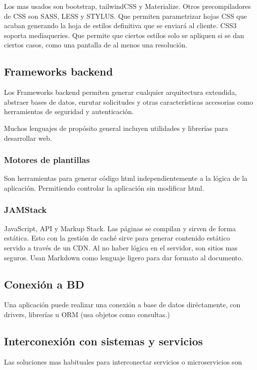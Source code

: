     Los mas usados son bootstrap, tailwindCSS y Materialize. Otros precompiladores de CSS son SASS, LESS y STYLUS. Que permiten parametrizar hojas CSS que acaban generando la hoja de estilos definitiva que se enviará al cliente. CSS3 soporta mediaqueries. Que permite que ciertos estilos solo se apliquen si se dan ciertos casos, como una pantalla de al menos una resolución.

\subsection{Frameworks backend}
    Los Frameworks backend permiten generar cualquier arquitectura extendida, abstraer bases de datos, enrutar solicitudes y otras características accesorias como herramientas de seguridad y autenticación.

    Muchos lenguajes de propósito general incluyen utilidades y librerías para desarrollar web.

    \subsubsection{Motores de plantillas}
        Son herramientas para generar código html independientemente a la lógica de la aplicación. Permitiendo controlar la aplicación sin modificar html.

    \subsubsection{JAMStack}
        JavaScript, API y Markup Stack. Las páginas se compilan y sirven de forma estática. Esto con la gestión de caché sirve para generar contenido estático servido a través de un CDN. Al no haber lógica en el servidor, son sitios mas seguros. Usan Markdown como lenguaje ligero para dar formato al documento. 

\subsection{Conexión a BD}
    Una aplicación puede realizar una conexión a base de datos diréctamente, con drivers, librerías u ORM (usa objetos como consultas.)

\subsection{Interconexión con sistemas y servicios}
    Las soluciones mas habituales para interconectar servicios o microservicios son

